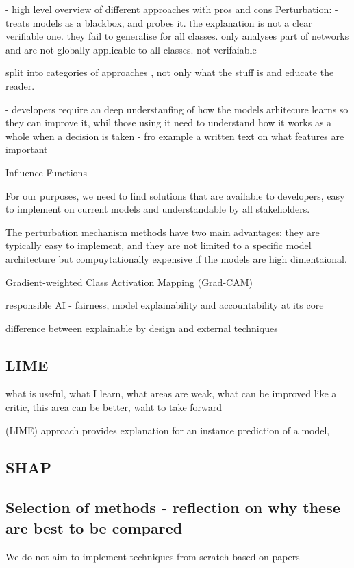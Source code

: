 \documentclass[proposal]{softeng}
\begin{document}
- high level overview of different approaches with pros and cons
Perturbation: 
- treats models as a blackbox, and probes it. the explanation is not a clear verifiable one. they fail to generalise for all classes. only analyses part of networks and are not globally applicable to all classes. not verifaiable 



split into categories of approaches , not only what the stuff is and educate the reader.

- developers require an deep understanfing of how the models arhitecure learns so they can improve it, whil those using it need to understand how it works as a whole when a decision is taken - fro example a written text on what features are important 

Influence Functions -




For our purposes, we need to find solutions that are available to developers, easy to implement on current models and understandable by all stakeholders.

The perturbation mechanism methods have two main advantages: they are typically easy to implement, and they are not limited to a specific model architecture but compuytationally expensive if the models are high dimentaional.

Gradient-weighted Class Activation Mapping (Grad-CAM)

responsible AI - fairness, model explainability and accountability at its core

difference between explainable by design and external techniques
\subsection{LIME}
what is useful, what I learn, what areas are weak, what can be improved 
like a critic, this area can be better, waht to take forward

(LIME) approach provides explanation for an instance prediction of a model,
\subsection{SHAP}
\subsection{Selection of methods - reflection on why these are best to be compared}
 We do not aim to implement techniques from scratch based on papers
\end{document}
